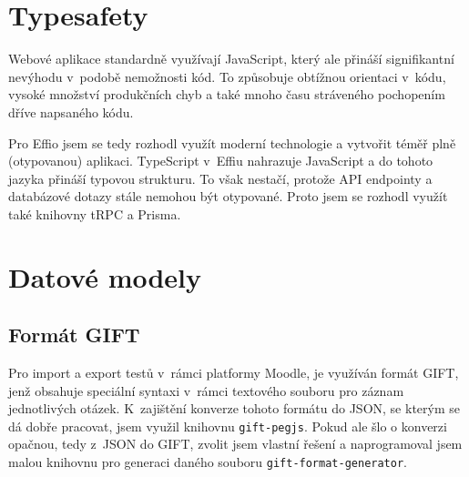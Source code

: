 \documentclass[12pt, a4paper,
openright
]{report}
\begin{document}


\section{Typesafety}
\label{sec:typesafety}

Webové aplikace standardně využívají JavaScript, který ale přináší signifikantní nevýhodu v~podobě nemožnosti  kód. To způsobuje obtížnou orientaci v~kódu, vysoké množství produkčních chyb a také mnoho času stráveného pochopením dříve napsaného kódu. 

Pro Effio jsem se tedy rozhodl využít moderní technologie a vytvořit téměř plně  (otypovanou) aplikaci. TypeScript v~Effiu nahrazuje JavaScript a do tohoto jazyka přináší typovou strukturu. To však nestačí, protože API endpointy a databázové dotazy stále nemohou být otypované. Proto jsem se rozhodl využít také knihovny tRPC a Prisma.

\section{Datové modely}
\subsection{Formát GIFT}
Pro import a export testů v~rámci platformy Moodle, je využíván formát GIFT, jenž obsahuje speciální syntaxi v~rámci textového souboru pro záznam jednotlivých otázek. K~zajištění konverze tohoto formátu do JSON, se kterým se dá dobře pracovat, jsem využil knihovnu \texttt{gift-pegjs}. Pokud ale šlo o konverzi opačnou, tedy z~JSON do GIFT, zvolit jsem vlastní řešení a  naprogramoval jsem malou knihovnu pro generaci daného souboru \texttt{gift-format-generator}.
\end{document}
